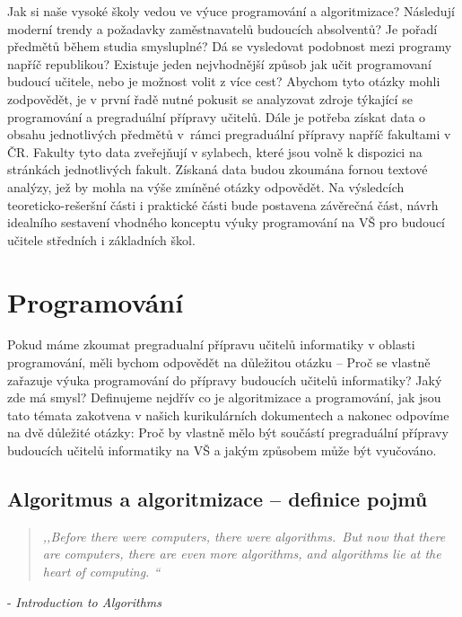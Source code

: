 \documentclass[FP,DP]{tulthesis}
\newcommand{\ahoj}[2]{\begin{quotation} \textit{#1} \end{quotation} \begin{flushright} - \textit{#2}\end{flushright} }
\begin{document}
Jak si naše vysoké školy vedou ve výuce programování a algoritmizace? Následují moderní trendy a požadavky zaměstnavatelů budoucích absolventů? Je pořadí předmětů během studia smysluplné? Dá se vysledovat podobnost mezi programy napříč republikou? Existuje  jeden nejvhodnější způsob jak učit programovaní budoucí učitele, nebo je možnost volit z více cest? Abychom tyto otázky mohli zodpovědět, je v první řadě nutné pokusit se analyzovat zdroje týkající se programování a pregraduální přípravy učitelů. Dále je potřeba získat data o obsahu jednotlivých předmětů v~rámci pregraduální přípravy napříč fakultami v ČR. Fakulty tyto data zveřejňují v sylabech, které jsou volně k dispozici na stránkách jednotlivých fakult. Získaná data budou zkoumána fornou textové analýzy, jež by mohla na výše zmíněné otázky odpovědět. Na výsledcích teoreticko-rešeršní části i praktické části bude postavena závěrečná část, návrh idealního sestavení vhodného konceptu výuky programování na VŠ pro budoucí učitele středních i základních škol.
\clearpage
\listoftodos
\chapter{Programování}
Pokud máme zkoumat pregradualní přípravu učitelů informatiky v oblasti programování, měli bychom odpovědět na důležitou otázku -- Proč se vlastně zařazuje výuka programování do přípravy budoucích učitelů informatiky? Jaký zde má smysl? Definujeme nejdřív co je algoritmizace a programování, jak jsou tato témata zakotvena v našich kurikulárních dokumentech a nakonec odpovíme na dvě důležité otázky: Proč by vlastně mělo být součástí pregraduální přípravy budoucích učitelů informatiky na VŠ a jakým způsobem může být vyučováno.
\section{Algoritmus a algoritmizace -- definice pojmů}
\ahoj{,,Before there were computers, there were algorithms.~But now that there are computers,
there are even more algorithms, and algorithms lie at the heart of computing. ``}{Introduction to Algorithms}
\end{document}
